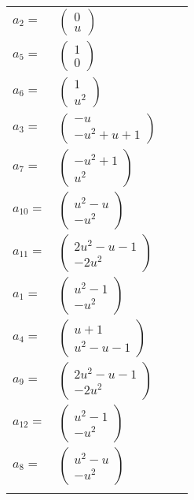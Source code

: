 \documentclass[1p]{elsarticle_modified}
\theoremstyle{definition}
\begin{document}
\begin{tabular}{m{7pt} m{180pt} m{7pt} m{180pt} }
\flushright $a_{2}=$&$\begin{pmatrix}0\\u\end{pmatrix}$ \\
\flushright $a_{5}=$&$\begin{pmatrix}1\\0\end{pmatrix}$ \\
\flushright $a_{6}=$&$\begin{pmatrix}1\\u^2\end{pmatrix}$ \\
\flushright $a_{3}=$&$\begin{pmatrix}- u\\- u^2+u+1\end{pmatrix}$ \\
\flushright $a_{7}=$&$\begin{pmatrix}- u^2+1\\u^2\end{pmatrix}$ \\
\flushright $a_{10}=$&$\begin{pmatrix}u^2- u\\- u^2\end{pmatrix}$ \\
\flushright $a_{11}=$&$\begin{pmatrix}2 u^2- u-1\\-2 u^2\end{pmatrix}$ \\
\flushright $a_{1}=$&$\begin{pmatrix}u^2-1\\- u^2\end{pmatrix}$ \\
\flushright $a_{4}=$&$\begin{pmatrix}u+1\\u^2- u-1\end{pmatrix}$ \\
\flushright $a_{9}=$&$\begin{pmatrix}2 u^2- u-1\\-2 u^2\end{pmatrix}$ \\
\flushright $a_{12}=$&$\begin{pmatrix}u^2-1\\- u^2\end{pmatrix}$ \\
\flushright $a_{8}=$&$\begin{pmatrix}u^2- u\\- u^2\end{pmatrix}$\\&\end{tabular}
\end{document}
